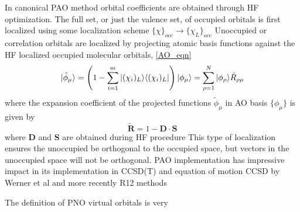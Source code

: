 		In canonical PAO method orbital coefficients are obtained through HF optimization.  The full set, or just the valence set, of occupied orbitals is first localized using some localization scheme $\{\chi\}_{occ} \rightarrow\{\chi_L\}_{occ}$   %
		Unoccupied or correlation orbitals are localized by projecting atomic basis functions against the HF localized occupied molecular orbitals, \cref{AO_eqn}
			\begin{equation}\label{proj_AO}
				| \tilde{\phi}_\mu \rangle = \left(1- \sum_{i=1}^{m} | (\chi_i)_L \rangle\langle(\chi_i)_L | \right) | \phi_\mu \rangle = \sum_{\rho=1}^N | \phi_\rho \rangle\tilde{R}_{\rho\mu}
			\end{equation}
		where the expansion coefficient of the projected functions $\tilde{\phi}_\mu$ in AO basis $\{\phi_\mu\}$ is given by 
			\begin{equation}
				\mathbf{\tilde{R}} = 1 - \mathbf{D} \cdot \mathbf{S}
			\end{equation}
		where \textbf{D} and \textbf{S} are obtained during HF procedure\cite{Hampel1996}
		This type of localization ensures the unoccupied be orthogonal to the occupied space, but vectors in the unoccupied space will not be orthogonal.  PAO implementation has impressive impact in its implementation in CCSD(T) and equation of motion CCSD by Werner et al and more recently R12 methods\cite{Riplinger2013}

		The definition of PNO virtual orbitals is very